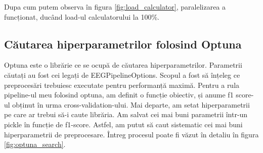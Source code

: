 Dupa cum putem observa în figura \ref{fig:load_calculator}, paralelizarea a funcționat, ducând load-ul calculatorului la 100\%.

\subsection{Căutarea hiperparametrilor folosind Optuna}
Optuna\cite{optuna_2019} este o librărie ce se ocupă de căutarea hiperparametrilor. Parametrii căutați au fost cei legați de EEGPipelineOptions. Scopul a fost să înțeleg ce preprocesări trebuiesc executate pentru performanță maximă. Pentru a rula pipeline-ul meu folosind optuna, am definit o funcție obiectiv, și anume f1 score-ul obținut în urma cross-validation-ului. Mai departe, am setat hiperparametrii pe care ar trebui să-i caute librăria. Am salvat cei mai buni parametrii într-un pickle în funcție de f1-score. Astfel, am putut să caut sistematic cei mai buni hiperparametrii de preprocesare. Întreg procesul poate fi văzut în detaliu în figura \ref{fig:optuna_search}.
